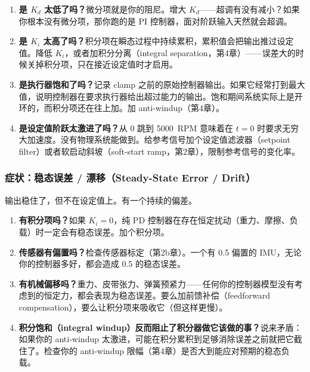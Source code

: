 \begin{enumerate}
    \item \textbf{是 $K_d$ 太低了吗？}微分项就是你的阻尼。增大 $K_d$——超调有没有减小？如果你根本没有微分项，那你跑的是 PI 控制器，面对阶跃输入天然就会超调。

    \item \textbf{是 $K_i$ 太高了吗？}积分项在瞬态过程中持续累积，累积值会把输出推过设定值。降低 $K_i$，或者加积分分离（integral separation，第4章）——误差大的时候关掉积分项，只在接近设定值时才启用。

    \item \textbf{是执行器饱和了吗？}记录 clamp 之前的原始控制器输出。如果它经常打到最大值，说明控制器在要求执行器给出超过能力的输出。饱和期间系统实际上是开环的，而积分项还在往上加。加 anti-windup（第4章）。

    \item \textbf{是设定值阶跃太激进了吗？}从 0 跳到 5000~RPM 意味着在 $t=0$ 时要求无穷大加速度。没有物理系统能做到。给参考信号加个设定值滤波器（setpoint filter）或者软启动斜坡（soft-start ramp，第2章），限制参考信号的变化率。
\end{enumerate}

\subsubsection{症状：稳态误差 / 漂移（Steady-State Error / Drift）}

输出稳住了，但不在设定值上。有一个持续的偏差。

\begin{enumerate}
    \item \textbf{有积分项吗？}如果 $K_i = 0$，纯 PD 控制器在存在恒定扰动（重力、摩擦、负载）时一定会有稳态误差。加个积分项。

    \item \textbf{传感器有偏置吗？}检查传感器标定（第2b章）。一个有 0.5\textdegree{} 偏置的 IMU，无论你的控制器多好，都会造成 0.5\textdegree{} 的稳态误差。

    \item \textbf{有机械偏移吗？}重力、皮带张力、弹簧预紧力——任何你的控制器模型没有考虑到的恒定力，都会表现为稳态误差。要么加前馈补偿（feedforward compensation），要么让积分项来吸收它（但这样更慢）。

    \item \textbf{积分饱和（integral windup）反而阻止了积分器做它该做的事？}说来矛盾：如果你的 anti-windup 太激进，可能在积分累积到足够消除误差之前就把它截住了。检查你的 anti-windup 限幅（第4章）是否大到能应对预期的稳态负载。
\end{enumerate}

